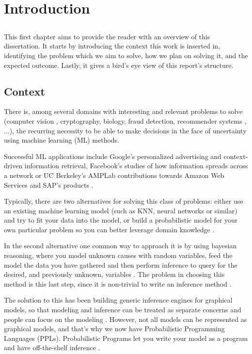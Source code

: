 \chapter{Introduction} \label{chap:intro}

\section*{}

This first chapter aims to provide the reader with an overview of this
dissertation. It starts by introducing the context this work is inserted in,
identifying the problem which we aim to solve, how we plan on solving it, and
the expected outcome. Lastly, it gives a bird's eye view of this report's
structure.

\section{Context} \label{sec:context}

There is, among several domains with interesting and relevant problems to solve
(computer vision \cite{Kulkarni2015}, cryptography, biology, fraud detection,
recommender systems \cite{intml}, ...), the recurring necessity to be able to
make decisions in the face of uncertainty using machine learning (ML) methods.

Successful ML applications include Google's personalized advertising and
context-driven information retrieval, Facebook's studies of how information
spreads across a network or UC Berkeley's AMPLab contributions towards Amazon
Web Services and SAP's products \cite{Broder:2015:BDN:2684822.2697027}.

Typically, there are two alternatives for solving this class of problems: either use an
existing machine learning model (such as KNN, neural networks or similar) \cite{mlnot} and
try to fit your data into the model, or build a probabilistic model for your
own particular problem so you can better leverage domain knowledge \cite{SciPy}.

In the second alternative one common way to approach it is by using bayesian reasoning,
where you model unknown causes with random variables, feed the model the data you
have gathered and then perform inference to query for the
desired, and previously unknown, variables \cite{thbay}. The problem in choosing
this method is this last step, since it is non-trivial
to write an inference method \cite{Duvenaud}.

The solution to this has been building generic inference engines for graphical
models, so that modeling and inference can be treated as separate concerns and
people can focus on the modeling \cite{Jordan1996}. However, not all models can be represented as
graphical models, and that’s why we now have Probabilistic Programming Languages
(PPLs). Probabilistic Programs let you write your model as a program and have
off-the-shelf inference \cite{Prekopa2003}.

